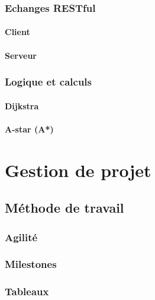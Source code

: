 \documentclass{article}
\begin{document}
\subsubsection{Echanges RESTful}

\paragraph{Client}

\paragraph{Serveur}

\subsubsection{Logique et calculs}

\paragraph{Dijkstra}

\paragraph{A-star (A*)}

\newpage


\section{Gestion de projet}

\subsection{Méthode de travail}

\subsubsection{Agilité}

\subsubsection{Milestones}

\subsubsection{Tableaux}
\end{document}
